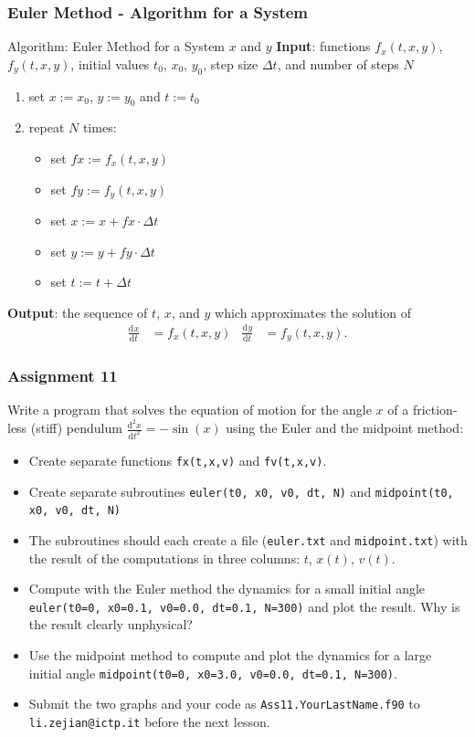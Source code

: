 \documentclass[11pt,aspectratio=169,handout]{beamer}
\newcommand{\dif}[3][]{\frac{\mathrm{d}^{#1}#3}{\mathrm{d}{#2}^{#1}}}
\begin{document}
\begin{frame}
\frametitle{Euler Method - Algorithm for a System}
\label{slide:euler-system}
\begin{block}{Algorithm: Euler Method for a System $x$ and $y$}
	\textbf{Input}: functions $f_x(t,x,y)$, $f_y(t,x,y)$, initial values $t_0$, $x_0$, $y_0$, step size $\Delta t$, and number of steps $N$
	\pause
	\begin{enumerate}
		\item set $x := x_0$, $y := y_0$ and $t := t_0$
		\item repeat $N$ times:
		\pause
		\begin{itemize}
			\item set $fx := f_x(t, x, y)$
			\item set $fy := f_y(t, x, y)$
			\pause
			\item set $x := x + fx \cdot \Delta t$
			\item set $y := y + fy \cdot \Delta t$
			\pause
			\item set $t := t + \Delta t$
		\end{itemize}		
	\end{enumerate}  
	\textbf{Output}: the sequence of $t$, $x$, and $y$ which approximates the solution of 
	\begin{align*}
		\dif{t}{x} &= f_x(t,x,y) & 
		\dif{t}{y} &= f_y(t,x,y).
	\end{align*}
\end{block}
\end{frame}


\begin{frame}
\frametitle{Assignment 11}
Write a program that solves the equation of motion for the angle $x$ of a friction-less (stiff) pendulum
$\dif[2]{t}{x} = -\sin(x)$
using the Euler and the midpoint method:
\pause
\begin{itemize}
	\item Create separate functions \texttt{fx(t,x,v)} and \texttt{fv(t,x,v)}.
	\item Create separate subroutines \texttt{euler(t0, x0, v0, dt, N)} and \texttt{midpoint(t0, x0, v0, dt, N)}
	\pause
	\item The subroutines should each create a file (\texttt{euler.txt} and \texttt{midpoint.txt}) with the result of the computations in three columns: $t$, $x(t)$, $v(t)$.
	\pause
	\item Compute with the Euler method the dynamics for a small initial angle \texttt{euler(t0=0, x0=0.1, v0=0.0, dt=0.1, N=300)} and plot the result. Why is the result clearly unphysical?
	\pause
	\item Use the midpoint method to compute and plot the dynamics for a large initial angle \texttt{midpoint(t0=0, x0=3.0, v0=0.0, dt=0.1, N=300)}.
	\item Submit the two graphs and your code as \texttt{Ass11.YourLastName.f90} to \texttt{li.zejian@ictp.it} before the next lesson.
\end{itemize}
\end{frame}
\end{document}
